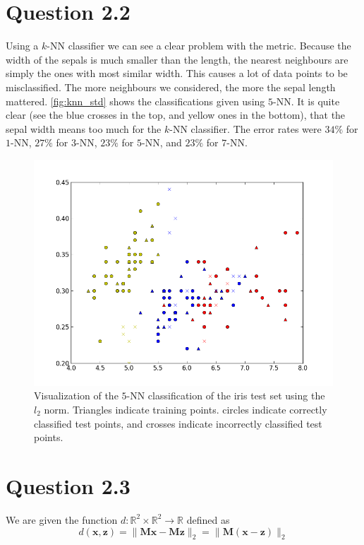 \documentclass[11pt,a4paper]{article}
\begin{document}
\section{Question 2.2}

Using a $k$-NN classifier we can see a clear problem with the metric. Because
the width of the sepals is much smaller than the length, the nearest neighbours
are simply the ones with most similar width. This causes a lot of data points
to be misclassified. The more neighbours we considered, the more the sepal
length mattered. \autoref{fig:knn_std} shows the classifications given using
$5$-NN. It is quite clear (see the blue crosses in the top, and yellow ones in
the bottom), that the sepal width means too much for the $k$-NN classifier.
The error rates were $34\%$ for $1$-NN, $27\%$ for $3$-NN, $23\%$ for $5$-NN,
and $23\%$ for $7$-NN.

\begin{figure}[htbp]
    \centering
    \includegraphics[width=\textwidth]{images/prob22-5nn.png}
    \caption{Visualization of the $5$-NN classification of the iris test set
    using the $l_2$ norm. Triangles indicate training points. circles indicate
    correctly classified test points, and crosses indicate incorrectly classified
    test points.}
    \label{fig:knn_std}
\end{figure}


\section{Question 2.3}
We are given the function $d : \mathbb{R}^2 \times \mathbb{R}^2 \rightarrow \mathbb{R}$ defined as
$$d(\bm{x},\bm{z}) = \| \bm{Mx} - \bm{Mz} \|_{2} = \| \bm{M}(\bm{x} - \bm{z}) \|_{2}$$
\end{document}
